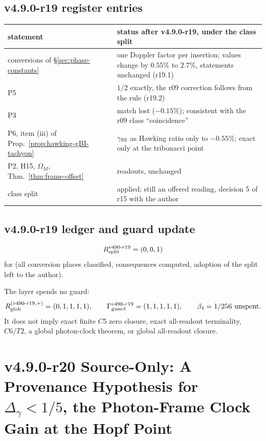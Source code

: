 \subsection*{v4.9.0-r19 register entries}
\label{subsec:v490-r19-register}

\begin{center}
\small
\begin{tabular}{@{}>{\raggedright\arraybackslash}p{}>{\raggedright\arraybackslash}p{}@{}}
\toprule
statement & status after v4.9.0-r19, under the class split\\
\midrule
conversions of \S\ref{sec:phase-constants} & one Doppler factor per insertion; values change by \(0.55\%\) to \(2.7\%\), statements unchanged (r19.1)\\
P5 & \(1/2\) exactly, the r09 correction follows from the rule (r19.2)\\
P3 & match lost (\(-0.15\%\)); consistent with the r09 class ``coincidence''\\
P6, item (iii) of Prop.~\ref{prop:hawking-gBI-tachyon} & \(\gamma_{\mathrm{BI}}\) as Hawking ratio only to \(-0.55\%\); exact only at the tribonacci point\\
P2, H15, \(\Omega_M\), Thm.~\ref{thm:frame-offset} & readouts, unchanged\\
class split & applied; still an offered reading, decision 5 of r15 with the author\\
\bottomrule
\end{tabular}
\end{center}

\subsection*{v4.9.0-r19 ledger and guard update}
\label{subsec:v490-r19-ledger-guard}

\[
R_{\rm split}^{v490\text{-}r19}=(0,0,1)
\]
for (all conversion places classified, consequences computed, adoption of the split left to the author).

The layer spends no guard:
\[
R_{\rm glob}^{(v490\text{-}r19,+)}=(0,1,1,1,1),
\qquad
\Gamma_{\rm guard}^{v490\text{-}r19}=(1,1,1,1,1),
\qquad
\beta_4=1/256\ \text{unspent}.
\]
It does not imply exact finite \(C5\) zero closure, exact all-readout terminality,
\(C6/T2\), a global photon-clock theorem, or global all-readout closure.

\clearpage
\section*{v4.9.0-r20 Source-Only: A Provenance Hypothesis for \texorpdfstring{\(\Delta_\gamma<1/5\)}{Delta gamma < 1/5}, the Photon-Frame Clock Gain at the Hopf Point}
\label{sec:v490-r20-delta-gamma-provenance}


